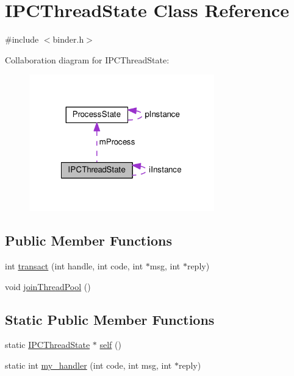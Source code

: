 \hypertarget{classIPCThreadState}{\section{I\-P\-C\-Thread\-State Class Reference}
\label{classIPCThreadState}
}


{\ttfamily \#include $<$binder.\-h$>$}



Collaboration diagram for I\-P\-C\-Thread\-State\-:
\nopagebreak
\begin{figure}[H]
\begin{center}
\leavevmode
\includegraphics[width=227pt]{classIPCThreadState__coll__graph}
\end{center}
\end{figure}
\subsection*{Public Member Functions}
\begin{DoxyCompactItemize}
\item 
int \hyperlink{classIPCThreadState_a12423983ca5df01ecb79163ea3e0df82}{transact} (int handle, int code, int $\ast$msg, int $\ast$reply)
\item 
void \hyperlink{classIPCThreadState_a68fd78989dbd0ac468b6f9f0cd17b5a8}{join\-Thread\-Pool} ()
\end{DoxyCompactItemize}
\subsection*{Static Public Member Functions}
\begin{DoxyCompactItemize}
\item 
static \hyperlink{classIPCThreadState}{I\-P\-C\-Thread\-State} $\ast$ \hyperlink{classIPCThreadState_a42c7daa79fc1364b3bd3ac8b0920bf0e}{self} ()
\item 
static int \hyperlink{classIPCThreadState_a37c4e27f1770cc5ca7ebd8ed330b4438}{my\-\_\-handler} (int code, int msg, int $\ast$reply)
\end{DoxyCompactItemize}
